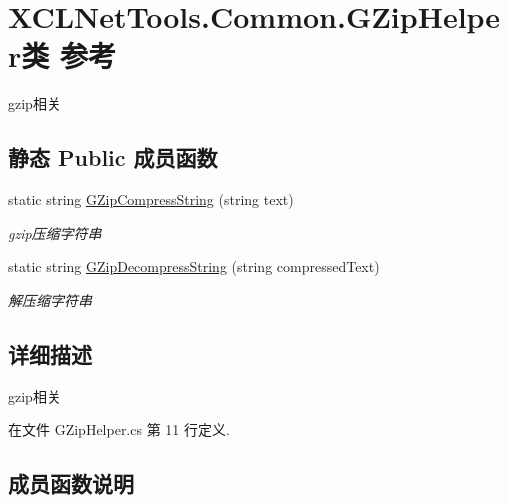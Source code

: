 \hypertarget{class_x_c_l_net_tools_1_1_common_1_1_g_zip_helper}{}\section{X\+C\+L\+Net\+Tools.\+Common.\+G\+Zip\+Helper类 参考}
\label{class_x_c_l_net_tools_1_1_common_1_1_g_zip_helper}


gzip相关  


\subsection*{静态 Public 成员函数}
\begin{DoxyCompactItemize}
\item 
static string \hyperlink{class_x_c_l_net_tools_1_1_common_1_1_g_zip_helper_ad3914d0de1ee45b5927c5cf242fd9893}{G\+Zip\+Compress\+String} (string text)
\begin{DoxyCompactList}\small\item\em gzip压缩字符串 \end{DoxyCompactList}\item 
static string \hyperlink{class_x_c_l_net_tools_1_1_common_1_1_g_zip_helper_a1bc9a866216b7c947e6c4aea6c8fef3d}{G\+Zip\+Decompress\+String} (string compressed\+Text)
\begin{DoxyCompactList}\small\item\em 解压缩字符串 \end{DoxyCompactList}\end{DoxyCompactItemize}


\subsection{详细描述}
gzip相关 



在文件 G\+Zip\+Helper.\+cs 第 11 行定义.



\subsection{成员函数说明}
\mbox{\label{class_x_c_l_net_tools_1_1_common_1_1_g_zip_helper_ad3914d0de1ee45b5927c5cf242fd9893}} 
